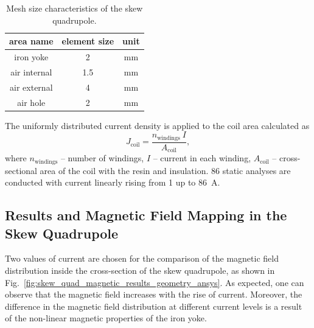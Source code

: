 \begin{table}[H]
    \caption{Mesh size characteristics of the skew quadrupole.} 
    \vspace{-1.em} 
    \fontsize{10}{10}
    \selectfont 
    \renewcommand{\arraystretch}{1.5}
    \begin{center}
        \begin{tabular}{ ccc } 
        \hline
        area name & element size & unit \\
        \hline
        iron yoke & 2 & mm \\
        air internal & 1.5 & mm \\
        air external & 4 & mm \\
        air hole & 2 & mm \\
        \hline 
        \end{tabular}
    \end{center}  
     \label{table:mesh_characteristics_magnetic_ansys} 
\end{table}

The uniformly distributed current density is applied to the coil area calculated as
\begin{equation}
    J_\text{coil} = \frac{n_\text{windings}~I}{A_\text{coil}},
\end{equation}
where $n_\text{windings}$ -- number of windings, $I$ -- current in each winding, $A_\text{coil}$ -- cross-sectional area of the coil with the resin and insulation. 86 static analyses are conducted with current linearly rising from 1 up to 86~A. 

\subsection{Results and Magnetic Field Mapping in the Skew Quadrupole}

Two values of current are chosen for the comparison of the magnetic field distribution inside the cross-section of the skew quadrupole, as shown in Fig.~\ref{fig:skew_quad_magnetic_results_geometry_ansys}. As expected, one can observe that the magnetic field increases with the rise of current. Moreover, the difference in the magnetic field distribution at different current levels is a result of the non-linear magnetic properties of the iron yoke.

